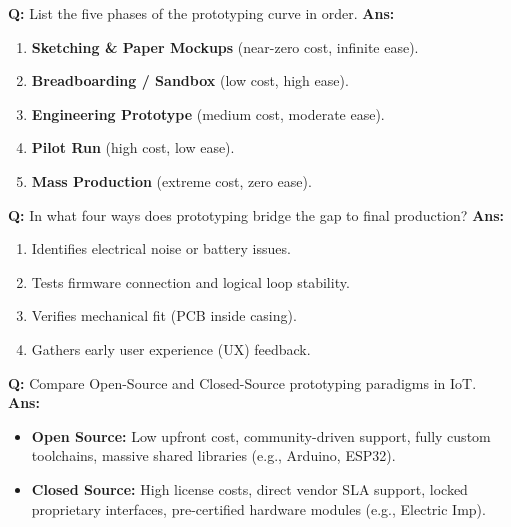 \documentclass[10pt,a4paper,twocolumn]{article}
\begin{document}
\begin{tcolorbox}[
  colback=white,
  colframe=UnitColorFour,
  colbacktitle=gray!10!white,
  coltitle=black,
  fonttitle=\bfseries\sffamily\small,
  title={Unit IV $\bullet$ Card 3},
  boxrule=1.2pt,
  arc=2mm,
  outer arc=2mm,
  boxsep=1.5mm,
  top=1mm,
  bottom=1mm,
  left=1.5mm,
  right=1.5mm,
  before skip=2.5mm,
  after skip=2.5mm
]
\textbf{Q:} List the five phases of the prototyping curve in order.
\tcbline
\textbf{Ans:} \begin{enumerate}
  \item \textbf{Sketching \& Paper Mockups} (near-zero cost, infinite ease).
  \item \textbf{Breadboarding / Sandbox} (low cost, high ease).
  \item \textbf{Engineering Prototype} (medium cost, moderate ease).
  \item \textbf{Pilot Run} (high cost, low ease).
  \item \textbf{Mass Production} (extreme cost, zero ease).
\end{enumerate}
\end{tcolorbox}


\begin{tcolorbox}[
  colback=white,
  colframe=UnitColorFour,
  colbacktitle=gray!10!white,
  coltitle=black,
  fonttitle=\bfseries\sffamily\small,
  title={Unit IV $\bullet$ Card 4},
  boxrule=1.2pt,
  arc=2mm,
  outer arc=2mm,
  boxsep=1.5mm,
  top=1mm,
  bottom=1mm,
  left=1.5mm,
  right=1.5mm,
  before skip=2.5mm,
  after skip=2.5mm
]
\textbf{Q:} In what four ways does prototyping bridge the gap to final production?
\tcbline
\textbf{Ans:} \begin{enumerate}
  \item Identifies electrical noise or battery issues.
  \item Tests firmware connection and logical loop stability.
  \item Verifies mechanical fit (PCB inside casing).
  \item Gathers early user experience (UX) feedback.
\end{enumerate}
\end{tcolorbox}


\begin{tcolorbox}[
  colback=white,
  colframe=UnitColorFour,
  colbacktitle=gray!10!white,
  coltitle=black,
  fonttitle=\bfseries\sffamily\small,
  title={Unit IV $\bullet$ Card 5},
  boxrule=1.2pt,
  arc=2mm,
  outer arc=2mm,
  boxsep=1.5mm,
  top=1mm,
  bottom=1mm,
  left=1.5mm,
  right=1.5mm,
  before skip=2.5mm,
  after skip=2.5mm
]
\textbf{Q:} Compare Open-Source and Closed-Source prototyping paradigms in IoT.
\tcbline
\textbf{Ans:} \begin{itemize}
  \item \textbf{Open Source:} Low upfront cost, community-driven support, fully custom toolchains, massive shared libraries (e.g., Arduino, ESP32).
  \item \textbf{Closed Source:} High license costs, direct vendor SLA support, locked proprietary interfaces, pre-certified hardware modules (e.g., Electric Imp).
\end{itemize}
\end{tcolorbox}
\end{document}
